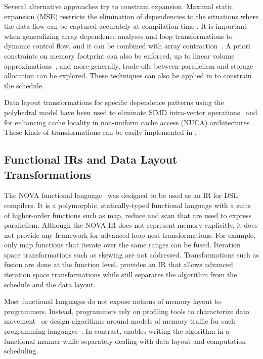 Several alternative approaches try to constrain expansion. Maximal static expansion (MSE) restricts the elimination of dependencies to the situations where the data flow can be captured accurately at compilation time \cite{cohen_optimization_1998}. It is important when generalizing array dependence analyses and loop transformations to dynamic control flow, and it can be combined with array contraction~\cite{cohen_parallelization_1999}. A priori constraints on memory footprint can also be enforced, up to linear volume approximations~\cite{thies_unified_2001}, and more generally, trade-offs between parallelism and storage allocation can be explored. %
These techniques can also be applied in \framework to constrain the schedule.

Data layout transformations for specific dependence patterns using the polyhedral model have been
used to eliminate SIMD intra-vector operations~\cite{henretty.11.cc} and for enhancing cache locality in non-uniform cache access (NUCA) architectures~\cite{lu-pact09}.  These kinds of transformations can be easily implemented in \framework.

\subsection{Functional IRs and Data Layout Transformations}

The NOVA functional language~\cite{Collins:2014:NFL:2627373.2627375} was designed to be used as an IR for DSL compilers.   It is a polymorphic, statically-typed functional language with a suite of higher-order functions such as map, reduce and scan that are used to express parallelism.  Although the NOVA IR does not represent memory explicitly, it does not provide any framework for advanced loop nest transformations.  For example, only map functions that iterate over the same ranges can be fused.  Iteration space transformations such as skewing are not addressed. Transformations such as fusion are done at the function level. \framework provides an IR that allows advanced iteration space transformations while still separates the algorithm from the schedule and the data layout.

Most functional languages do not expose notions of memory layout to programmers.  Instead, programmers rely on profiling tools to characterize data movement~\cite{Spoonhower:2008:SPP:1411203.1411240} or design algorithms around models of memory traffic for such programming languages~\cite{Blelloch:2013:CIE:2429069.2429077}.  In contrast, \framework{} enables writing the algorithm in a functional manner while separately dealing with data layout and computation scheduling.

